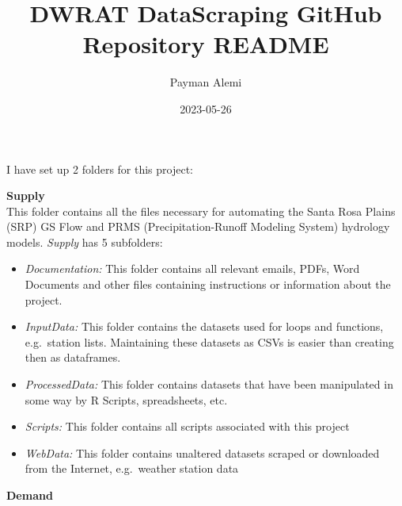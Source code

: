 \documentclass[
]{article}
\title{DWRAT DataScraping GitHub Repository README}
\author{Payman Alemi}
\date{2023-05-26}
\begin{document}
\maketitle

I have set up 2 folders for this project:

\textbf{Supply}\\
This folder contains all the files necessary for automating the Santa
Rosa Plains (SRP) GS Flow and PRMS (Precipitation-Runoff Modeling
System) hydrology models. \emph{Supply} has 5 subfolders:

\begin{itemize}
\item
  \emph{Documentation:} This folder contains all relevant emails, PDFs,
  Word Documents and other files containing instructions or information
  about the project.
\item
  \emph{InputData:} This folder contains the datasets used for loops and
  functions, e.g.~station lists. Maintaining these datasets as CSVs is
  easier than creating then as dataframes.
\item
  \emph{ProcessedData:} This folder contains datasets that have been
  manipulated in some way by R Scripts, spreadsheets, etc.
\item
  \emph{Scripts:} This folder contains all scripts associated with this
  project
\item
  \emph{WebData:} This folder contains unaltered datasets scraped or
  downloaded from the Internet, e.g.~weather station data
\end{itemize}

\textbf{Demand}
\end{document}

